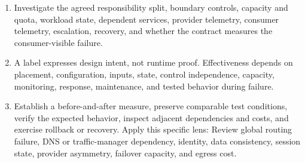 \documentclass[11pt]{article}
\begin{document}
\begin{enumerate}
\item Investigate the agreed responsibility split, boundary controls, capacity and quota, workload state, dependent services, provider telemetry, consumer telemetry, escalation, recovery, and whether the contract measures the consumer-visible failure.
\item A label expresses design intent, not runtime proof. Effectiveness depends on placement, configuration, inputs, state, control independence, capacity, monitoring, response, maintenance, and tested behavior during failure.
\item Establish a before-and-after measure, preserve comparable test conditions, verify the expected behavior, inspect adjacent dependencies and costs, and exercise rollback or recovery. Apply this specific lens: Review global routing failure, DNS or traffic-manager dependency, identity, data consistency, session state, provider asymmetry, failover capacity, and egress cost.
\end{enumerate}
\end{document}
